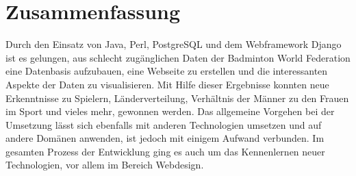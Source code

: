\documentclass[12pt,a4paper]{scrreprt}
\newcommand{\changefont}[3]{
\fontfamily{#1} \fontseries{#2} \fontshape{#3} \selectfont}
\begin{document}
\changefont{cmr}{m}{n}
 
\newpage

\tableofcontents 







\chapter*{Zusammenfassung}
Durch den Einsatz von Java, Perl, PostgreSQL und dem Webframework Django ist es gelungen, aus schlecht zugänglichen Daten der Badminton World Federation eine Datenbasis aufzubauen, eine Webseite zu erstellen und die interessanten Aspekte der Daten zu visualisieren. Mit Hilfe dieser Ergebnisse konnten neue Erkenntnisse zu Spielern, Länderverteilung, Verhältnis der Männer zu den Frauen im Sport und vieles mehr, gewonnen werden.
\newline \newline
Das allgemeine Vorgehen bei der Umsetzung lässt sich ebenfalls mit anderen Technologien umsetzen und auf andere Domänen anwenden, ist jedoch mit einigem Aufwand verbunden. Im gesamten Prozess der Entwicklung ging es auch um das Kennenlernen neuer Technologien, vor allem im Bereich Webdesign.

\printbibliography	
\end{document}
